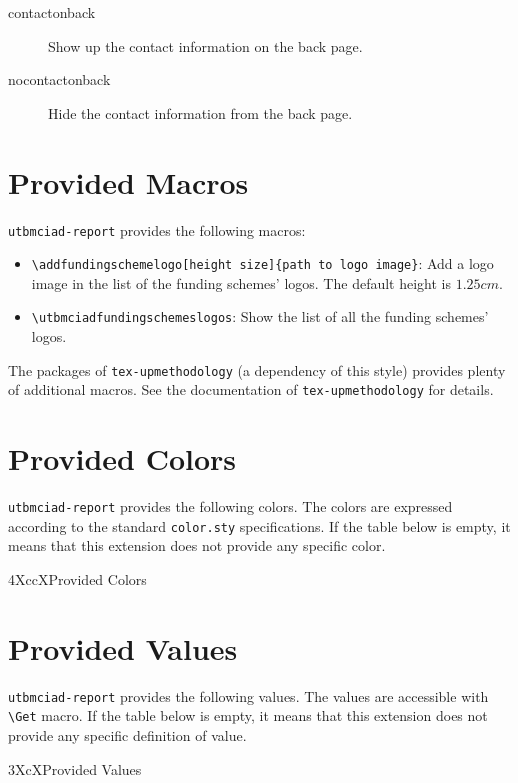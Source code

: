 \documentclass[english,article,nodocrefonfront,nodocrefonback]{utbmciadreport}
\gdef\upmextensiondoccolorlist{}
\gdef\upmextensiondocvaluelist{}
\begin{document}
\begin{description}
\item[contactonback] Show up the contact information on the back page.
\item[nocontactonback] Hide the contact information from the back page.
\end{description}

\section{Provided Macros}

\texttt{utbmciad-report} provides the following macros:
\begin{itemize}
\item \texttt{{\textbackslash}addfundingschemelogo[height size]\{path to logo image\}}: Add a logo image in the list of the funding schemes' logos. The default height is $1.25cm$.
\item \texttt{{\textbackslash}utbmciadfundingschemeslogos}: Show the list of all the funding schemes' logos.
\end{itemize}

The packages of \texttt{tex-upmethodology} (a dependency of this style) provides plenty of additional macros. See the documentation of \texttt{tex-upmethodology} for details.

\section{Provided Colors}

\texttt{utbmciad-report} provides the following colors. The colors are expressed according to the standard \texttt{color.sty} specifications. If the table below is empty, it means that this extension does not provide any specific color.

\begin{mtabular}{4}{XccX}{Provided Colors}
\upmextensiondoccolorlist
\end{mtabular}

\section{Provided Values}

\texttt{utbmciad-report} provides the following values. The values are accessible with \texttt{{\textbackslash}Get} macro. If the table below is empty, it means that this extension does not provide any specific definition of value.

\begin{tiny}
\begin{mtabular}{3}{XcX}{Provided Values}
\upmextensiondocvaluelist
\end{mtabular}
\end{tiny}
\end{document}
